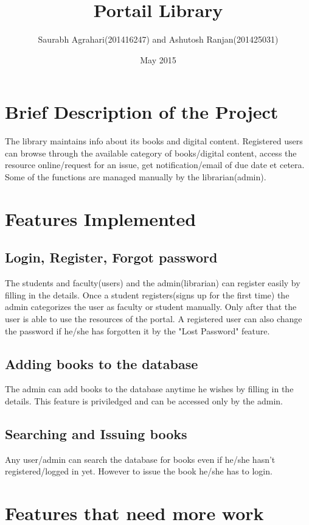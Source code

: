 \documentclass{article}
\title{Portail Library}
\author{Saurabh Agrahari(201416247) and Ashutosh Ranjan(201425031)}
\date{May 2015}
\begin{document}
\maketitle



\section{Brief Description of the Project}



\large{The library maintains info about its books and digital content. Registered users can browse 
    through the available category of books/digital content, access the resource online/request for 
	an issue, get notification/email of due date et cetera. Some of the functions are managed manually by the librarian(admin).}


\section{Features Implemented}
\subsection{Login, Register, Forgot password}
\large{The students and faculty(users) and the admin(librarian) can register easily by filling in the details. Once a student registers(signs up for the first time) the admin categorizes the user as faculty or student manually. Only after that the user is able to use the resources of the portal. A registered user can also change the password if he/she has forgotten it by the "Lost Password" feature.}

\subsection{Adding books to the database}
\large{The admin can add books to the database anytime he wishes by filling in the details. This feature is priviledged and can be accessed only by the admin.}

\subsection{Searching and Issuing books}
\large{Any user/admin can search the database for books even if he/she hasn't registered/logged in yet. However to issue the book he/she has to login.}

\section{Features that need more work}
\end{document}
